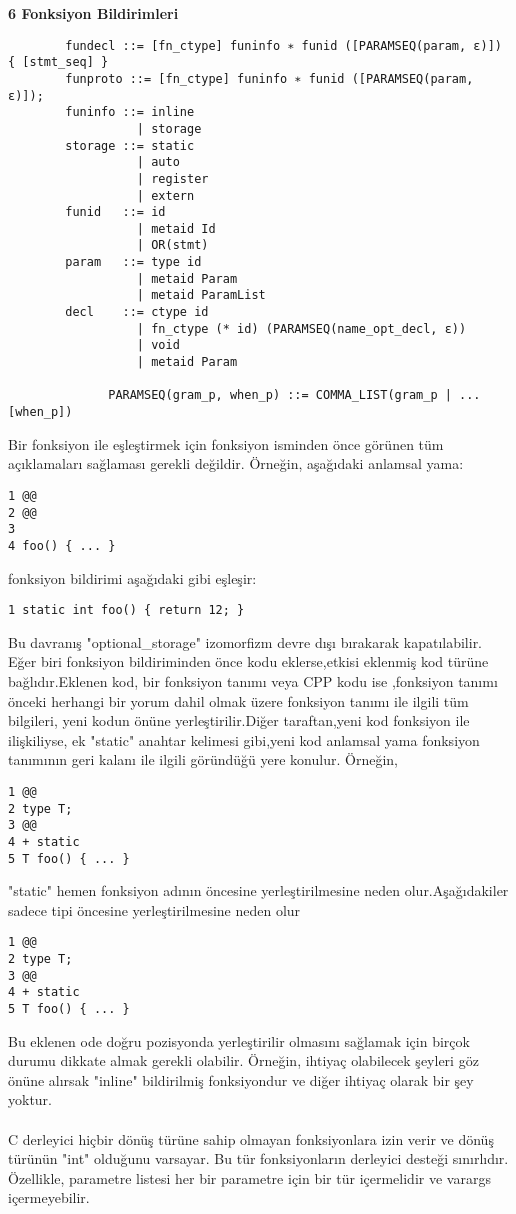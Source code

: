 \documentclass{article}
\begin{document}
\textbf{6 Fonksiyon Bildirimleri}
\begin{lstlisting}
        fundecl ::= [fn_ctype] funinfo ∗ funid ([PARAMSEQ(param, ε)]) { [stmt_seq] }
        funproto ::= [fn_ctype] funinfo ∗ funid ([PARAMSEQ(param, ε)]);
        funinfo ::= inline
                  | storage
        storage ::= static
                  | auto
                  | register
                  | extern
        funid   ::= id
                  | metaid Id
                  | OR(stmt)
        param   ::= type id
                  | metaid Param
                  | metaid ParamList
        decl    ::= ctype id
                  | fn_ctype (* id) (PARAMSEQ(name_opt_decl, ε))
                  | void
                  | metaid Param

              PARAMSEQ(gram_p, when_p) ::= COMMA_LIST(gram_p | ...[when_p])
\end{lstlisting}

Bir fonksiyon ile eşleştirmek için fonksiyon isminden önce görünen tüm açıklamaları sağlaması gerekli değildir. Örneğin, aşağıdaki anlamsal yama:
\\
\begin{lstlisting}
1 @@
2 @@
3
4 foo() { ... }
\end{lstlisting}
fonksiyon bildirimi aşağıdaki gibi eşleşir:

\begin{lstlisting}
1 static int foo() { return 12; }
\end{lstlisting}

Bu davranış  "optional\_storage" izomorfizm devre dışı bırakarak kapatılabilir. Eğer biri fonksiyon bildiriminden önce kodu eklerse,etkisi eklenmiş kod türüne bağlıdır.Eklenen kod, bir fonksiyon tanımı veya CPP kodu ise ,fonksiyon tanımı önceki herhangi bir yorum dahil olmak üzere fonksiyon tanımı ile ilgili tüm bilgileri, yeni kodun önüne yerleştirilir.Diğer taraftan,yeni kod fonksiyon ile ilişkiliyse, ek "static" anahtar kelimesi gibi,yeni kod anlamsal yama fonksiyon tanımının geri kalanı ile ilgili göründüğü yere konulur. Örneğin,

\begin{lstlisting}
1 @@
2 type T;
3 @@
4 + static
5 T foo() { ... }
\end{lstlisting}

"static" hemen fonksiyon adının öncesine yerleştirilmesine neden olur.Aşağıdakiler sadece tipi öncesine yerleştirilmesine neden olur
\begin{lstlisting}
1 @@
2 type T;
3 @@
4 + static
5 T foo() { ... }
\end{lstlisting}

Bu eklenen ode doğru pozisyonda yerleştirilir olmasını sağlamak için birçok durumu dikkate almak gerekli olabilir. Örneğin, ihtiyaç olabilecek şeyleri göz önüne alırsak "inline" bildirilmiş fonksiyondur ve diğer ihtiyaç olarak bir şey yoktur.\\
\\
C derleyici hiçbir dönüş türüne sahip olmayan fonksiyonlara izin verir ve dönüş türünün "int" olduğunu varsayar. Bu tür fonksiyonların derleyici desteği sınırlıdır. Özellikle, parametre listesi her bir parametre için bir tür içermelidir ve varargs içermeyebilir.
\end{document}
